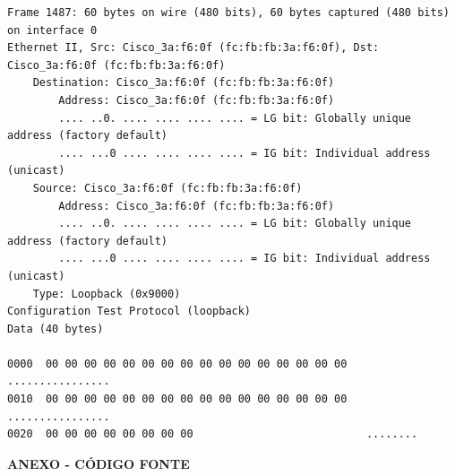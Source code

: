 \documentclass[a4paper,11pt]{article}
\begin{document}
\begin{lstlisting}
Frame 1487: 60 bytes on wire (480 bits), 60 bytes captured (480 bits) on interface 0
Ethernet II, Src: Cisco_3a:f6:0f (fc:fb:fb:3a:f6:0f), Dst: Cisco_3a:f6:0f (fc:fb:fb:3a:f6:0f)
    Destination: Cisco_3a:f6:0f (fc:fb:fb:3a:f6:0f)
        Address: Cisco_3a:f6:0f (fc:fb:fb:3a:f6:0f)
        .... ..0. .... .... .... .... = LG bit: Globally unique address (factory default)
        .... ...0 .... .... .... .... = IG bit: Individual address (unicast)
    Source: Cisco_3a:f6:0f (fc:fb:fb:3a:f6:0f)
        Address: Cisco_3a:f6:0f (fc:fb:fb:3a:f6:0f)
        .... ..0. .... .... .... .... = LG bit: Globally unique address (factory default)
        .... ...0 .... .... .... .... = IG bit: Individual address (unicast)
    Type: Loopback (0x9000)
Configuration Test Protocol (loopback)
Data (40 bytes)

0000  00 00 00 00 00 00 00 00 00 00 00 00 00 00 00 00   ................
0010  00 00 00 00 00 00 00 00 00 00 00 00 00 00 00 00   ................
0020  00 00 00 00 00 00 00 00                           ........

\end{lstlisting}


\newpage

\vspace*{\fill} 
\centering
\begin{Huge}\textbf{ANEXO - CÓDIGO FONTE}\end{Huge}
\vspace*{\fill}
\thispagestyle{empty}
\setcounter{page}{1}
\end{document}
